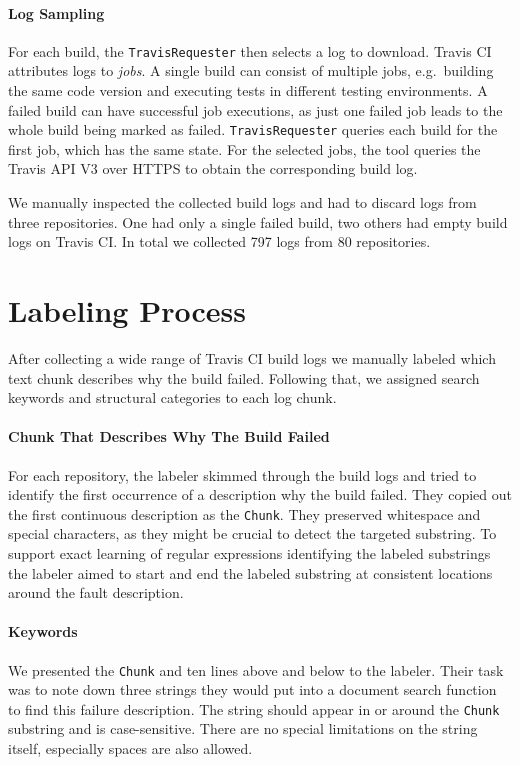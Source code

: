 \documentclass[\myrootdir/main.tex]{subfiles}
\begin{document}
\paragraph{Log Sampling}
For each build, the \texttt{TravisRequester} then selects a log to download.
Travis CI attributes logs to \emph{jobs}.
A single build can consist of multiple jobs, e.g.\ building the same code version and executing tests in different testing environments.
A failed build can have successful job executions, as just one failed job leads to the whole build being marked as failed.
\texttt{TravisRequester} queries each build for the first job, which has the same state.
For the selected jobs, the tool queries the Travis API V3 over HTTPS to obtain the corresponding build log.

We manually inspected the collected build logs and had to discard logs from three repositories.
One had only a single failed build, two others had empty build logs on Travis CI\@.
In total we collected 797 logs from 80 repositories.

\section{Labeling Process}
\label{sec:labeling-process}
After collecting a wide range of Travis CI build logs we manually labeled which text chunk describes why the build failed.
Following that, we assigned search keywords and structural categories to each log chunk.

\paragraph{Chunk That Describes Why The Build Failed}
For each repository, the labeler skimmed through the build logs and tried to identify the first occurrence of a description why the build failed.
They copied out the first continuous description as the \texttt{Chunk}.
They preserved whitespace and special characters, as they might be crucial to detect the targeted substring.
To support exact learning of regular expressions identifying the labeled substrings the labeler aimed to start and end the labeled substring at consistent locations around the fault description.

\paragraph{Keywords}
We presented the \texttt{Chunk} and ten lines above and below to the labeler.
Their task was to note down three strings they would put into a document search function to find this failure description.
The string should appear in or around the \texttt{Chunk} substring and is case-sensitive.
There are no special limitations on the string itself, especially spaces are also allowed.
\end{document}
